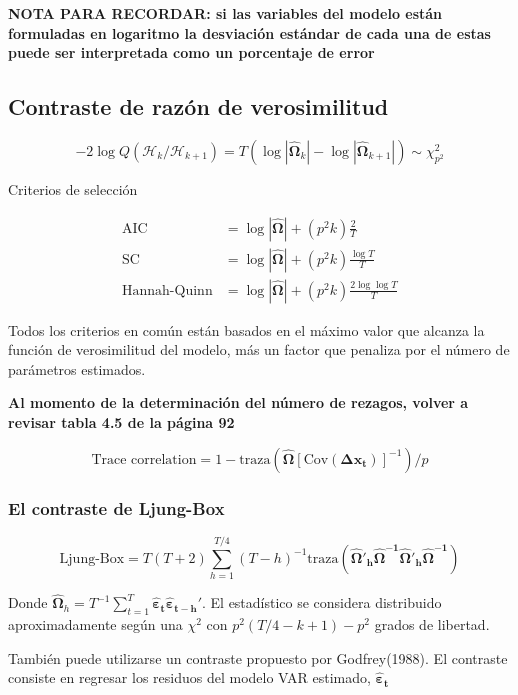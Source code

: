 \documentclass[12pt, twoside]{book}\usepackage[]{graphicx}\usepackage[]{color}
\let\bold\boldsymbol
\numberwithin{equation}{section}
\numberwithin{theorem}{section}
\numberwithin{teorema}{section}
\numberwithin{defi}{section}
\numberwithin{prop}{section}
\numberwithin{defi}{section}
\theoremstyle{plain}
\begin{document}
{\textbf{NOTA PARA RECORDAR: si las variables del modelo están formuladas en logaritmo la desviación estándar de cada una de estas puede ser interpretada como un porcentaje de error }


\subsection{Contraste de razón de verosimilitud}

\begin{equation}
  -2\log Q(\mathcal{H}_{k}/\mathcal{H}_{k+1}) =  T(\log|\boldsymbol{\hat{\Omega}}_{k}|-\log|\boldsymbol{\hat{\Omega}}_{k+1}|) \sim \chi^{2}_{p^{2}}
\end{equation}


Criterios de selección 

\begin{align}
\text{AIC} & = \log |\boldsymbol{\hat{\Omega}}|+(p^{2}k)\frac{2}{T} \\ 
\text{SC} & = \log|\boldsymbol{\hat{\Omega}}|+(p^{2}k)\frac{\log T}{T} \\ 
\text{Hannah-Quinn} & = \log|\boldsymbol{\hat{\Omega}}|+(p^{2}k)\frac{2\log \log T}{T}
\end{align}

Todos los criterios en común están basados en el máximo valor que alcanza la función de verosimilitud del modelo, más un factor que penaliza por el número de parámetros estimados. 

\textbf{
Al momento de la determinación del número de rezagos, volver a revisar tabla 4.5 de la página 92}

\begin{equation}
\text{Trace correlation} = 1-\text{traza}(\boldsymbol{\hat{\Omega}}[\text{Cov}(\bold{\Delta x_{t}})]^{-1})/p 
\end{equation}


\subsubsection{El contraste de Ljung-Box}

\begin{equation}
\text{Ljung-Box} = T(T+2)\sum_{h=1}^{T/4}(T-h)^{-1}\text{traza}(\boldsymbol{\hat{\Omega}'_{h}\hat{\Omega}^{-1}\hat{\Omega}'_{h}\hat{\Omega}^{-1}})
\end{equation}

Donde  $ \boldsymbol{\hat{\Omega}}_{h} = T^{-1}\sum_{t=1}^{T}\boldsymbol{\hat{\varepsilon}_{t}\hat{\varepsilon}_{t-h}'}$. El estadístico se considera distribuido aproximadamente según una $\chi^{2}$ con $p^{2}(T/4-k+1)-p^{2}$ grados de libertad. 

También puede utilizarse un contraste propuesto por Godfrey(1988). El contraste consiste en regresar los residuos del modelo VAR estimado, $\boldsymbol{\hat{\varepsilon}_{t}}$
}
\end{document}
